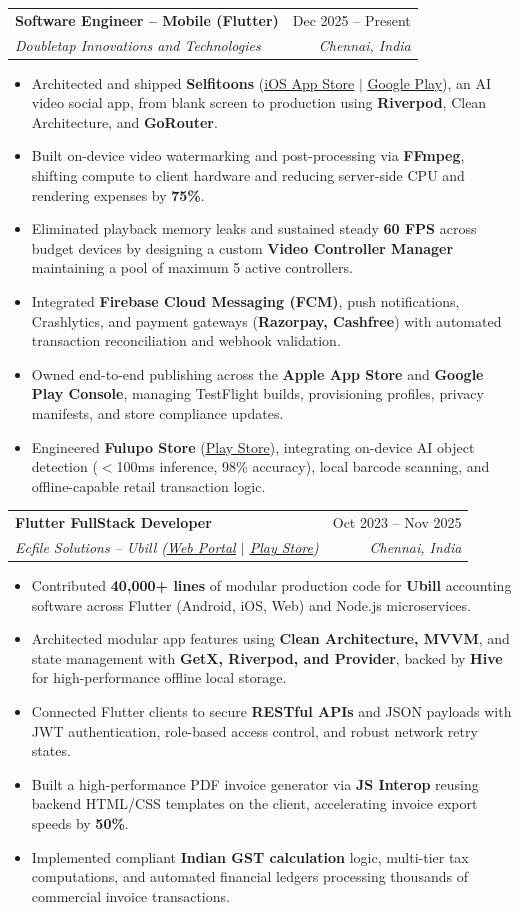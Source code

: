 \documentclass[letterpaper,10pt]{article}
\makeatletter
\newcommand{\resumeItem}[1]{
  \item\small{
    {#1 \vspace{-2pt}}
  }
}
\newcommand{\resumeSubheading}[4]{
  \vspace{-2pt}\item
    \begin{tabular*}{0.97\textwidth}[t]{l@{\extracolsep{\fill}}r}
      \textbf{#1} & #2 \\
      \textit{\small#3} & \textit{\small #4} \\
    \end{tabular*}\vspace{-6pt}
}
\newcommand{\resumeItemListStart}{\begin{itemize}}
\newcommand{\resumeItemListEnd}{\end{itemize}\vspace{-5pt}}
\makeatother
\begin{document}
    \resumeSubheading
      {Software Engineer -- Mobile (Flutter)}{Dec 2025 -- Present}
      {Doubletap Innovations and Technologies}{Chennai, India}
      \resumeItemListStart
        \resumeItem{Architected and shipped \textbf{Selfitoons} (\href{https://apps.apple.com/in/app/selfitoons/id6758597947}{\underline{iOS App Store}} $|$ \href{https://play.google.com/store/apps/details?id=com.doubletap.ai.selfitoons}{\underline{Google Play}}), an AI video social app, from blank screen to production using \textbf{Riverpod}, Clean Architecture, and \textbf{GoRouter}.}
        \resumeItem{Built on-device video watermarking and post-processing via \textbf{FFmpeg}, shifting compute to client hardware and reducing server-side CPU and rendering expenses by \textbf{75\%}.}
        \resumeItem{Eliminated playback memory leaks and sustained steady \textbf{60 FPS} across budget devices by designing a custom \textbf{Video Controller Manager} maintaining a pool of maximum 5 active controllers.}
        \resumeItem{Integrated \textbf{Firebase Cloud Messaging (FCM)}, push notifications, Crashlytics, and payment gateways (\textbf{Razorpay, Cashfree}) with automated transaction reconciliation and webhook validation.}
        \resumeItem{Owned end-to-end publishing across the \textbf{Apple App Store} and \textbf{Google Play Console}, managing TestFlight builds, provisioning profiles, privacy manifests, and store compliance updates.}
        \resumeItem{Engineered \textbf{Fulupo Store} (\href{https://play.google.com/store/apps/details?id=com.doubletap.fulupostore}{\underline{Play Store}}), integrating on-device AI object detection ($<$100ms inference, 98\% accuracy), local barcode scanning, and offline-capable retail transaction logic.}
      \resumeItemListEnd

    \resumeSubheading
      {Flutter FullStack Developer}{Oct 2023 -- Nov 2025}
      {Ecfile Solutions -- Ubill (\href{https://app.ubill.tech/}{\underline{Web Portal}} $|$ \href{https://play.google.com/store/apps/details?id=com.ubill.tech}{\underline{Play Store}})}{Chennai, India}
      \resumeItemListStart
        \resumeItem{Contributed \textbf{40,000+ lines} of modular production code for \textbf{Ubill} accounting software across Flutter (Android, iOS, Web) and Node.js microservices.}
        \resumeItem{Architected modular app features using \textbf{Clean Architecture, MVVM}, and state management with \textbf{GetX, Riverpod, and Provider}, backed by \textbf{Hive} for high-performance offline local storage.}
        \resumeItem{Connected Flutter clients to secure \textbf{RESTful APIs} and JSON payloads with JWT authentication, role-based access control, and robust network retry states.}
        \resumeItem{Built a high-performance PDF invoice generator via \textbf{JS Interop} reusing backend HTML/CSS templates on the client, accelerating invoice export speeds by \textbf{50\%}.}
        \resumeItem{Implemented compliant \textbf{Indian GST calculation} logic, multi-tier tax computations, and automated financial ledgers processing thousands of commercial invoice transactions.}
      \resumeItemListEnd
\end{document}

